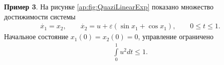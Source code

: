 \documentclass[../main.tex]{subfiles}
\begin{document}
  \textbf{Пример 3}. На рисунке \ref{ap:fig:QuaziLinearExp} показано множество достижимости системы 
  \begin{gather}\label{ap:Example3}
  	\dot{x_1} = x_2, \qquad
  	\dot{x_2} = u + \varepsilon(\sin x_1 + \cos x_1) ,\qquad 0\leqslant t \leqslant 1.
  \end{gather}
  Начальное состояние $x_1(0) = x_2(0) = 0 $, управление ограничено 
  \begin{gather}\label{example3_controls}
  	\int\limits_0^1 u^2dt \leqslant 1.
  \end{gather}
 
\end{document}
